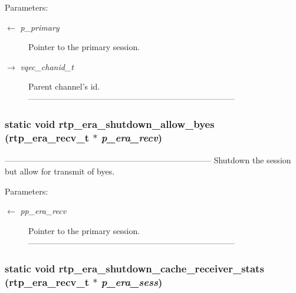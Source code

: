 \begin{Desc}
\item[Parameters:]
\begin{description}
\item[\mbox{$\leftarrow$} {\em p\_\-primary}]Pointer to the primary session. \item[\mbox{$\rightarrow$} {\em vqec\_\-chanid\_\-t}]Parent channel's id. --------------------------------------------------------------------------- \end{description}
\end{Desc}
\subsubsection{\setlength{\rightskip}{0pt plus 5cm}static void rtp\_\-era\_\-shutdown\_\-allow\_\-byes (\bf{rtp\_\-era\_\-recv\_\-t} $\ast$ {\em p\_\-era\_\-recv})\hspace{0.3cm}{\tt  [static]}}\label{rtp__era__recv_8c_66132ca79703b7d5421f7bab2fdaf646}


--------------------------------------------------------------------------- Shutdown the session but allow for transmit of byes.

\begin{Desc}
\item[Parameters:]
\begin{description}
\item[\mbox{$\leftarrow$} {\em pp\_\-era\_\-recv}]Pointer to the primary session. --------------------------------------------------------------------------- \end{description}
\end{Desc}
\subsubsection{\setlength{\rightskip}{0pt plus 5cm}static void rtp\_\-era\_\-shutdown\_\-cache\_\-receiver\_\-stats (\bf{rtp\_\-era\_\-recv\_\-t} $\ast$ {\em p\_\-era\_\-sess})\hspace{0.3cm}{\tt  [static]}}\label{rtp__era__recv_8c_253db12a64f2b8cdbdab0f65cf1109ab}


